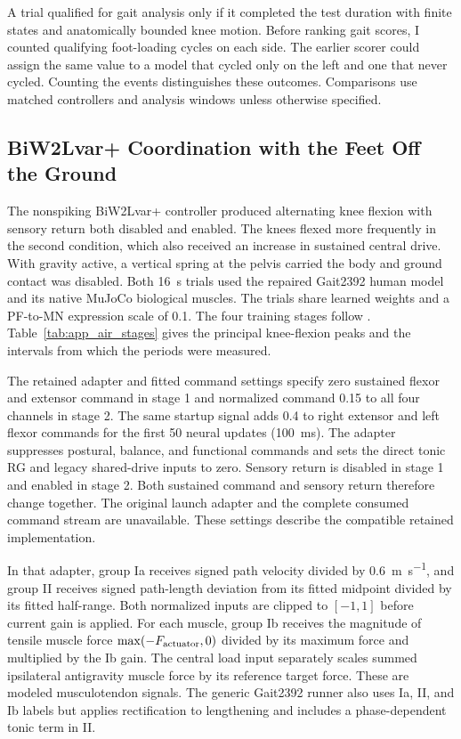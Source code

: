 A trial qualified for gait analysis only if it completed the test duration with finite states and anatomically bounded knee motion. Before ranking gait scores, I counted qualifying foot-loading cycles on each side. The earlier scorer could assign the same value to a model that cycled only on the left and one that never cycled. Counting the events distinguishes these outcomes. Comparisons use matched controllers and analysis windows unless otherwise specified.

\subsection{BiW2Lvar+ Coordination with the Feet Off the Ground}\label{sec:app_biw2l_air}

The nonspiking BiW2Lvar+ controller produced alternating knee flexion with sensory return both disabled and enabled. The knees flexed more frequently in the second condition, which also received an increase in sustained central drive. With gravity active, a vertical spring at the pelvis carried the body and ground contact was disabled. Both \qty{16}{\second} trials used the repaired Gait2392 human model and its native MuJoCo biological muscles. The trials share learned weights and a PF-to-MN expression scale of 0.1. The four training stages follow \citet{hunt_development_2017}. Table~\ref{tab:app_air_stages} gives the principal knee-flexion peaks and the intervals from which the periods were measured.

The retained adapter and fitted command settings specify zero sustained flexor and extensor command in stage 1 and normalized command 0.15 to all four channels in stage 2. The same startup signal adds 0.4 to right extensor and left flexor commands for the first 50 neural updates (\qty{100}{\milli\second}). The adapter suppresses postural, balance, and functional commands and sets the direct tonic RG and legacy shared-drive inputs to zero. Sensory return is disabled in stage 1 and enabled in stage 2. Both sustained command and sensory return therefore change together. The original launch adapter and the complete consumed command stream are unavailable. These settings describe the compatible retained implementation.

In that adapter, group Ia receives signed path velocity divided by \qty{0.6}{\meter\per\second}, and group II receives signed path-length deviation from its fitted midpoint divided by its fitted half-range. Both normalized inputs are clipped to $[-1,1]$ before current gain is applied. For each muscle, group Ib receives the magnitude of tensile muscle force $\max(-F_{\rm actuator},0)$ divided by its maximum force and multiplied by the Ib gain. The central load input separately scales summed ipsilateral antigravity muscle force by its reference target force. These are modeled musculotendon signals. The generic Gait2392 runner also uses Ia, II, and Ib labels but applies rectification to lengthening and includes a phase-dependent tonic term in II.

